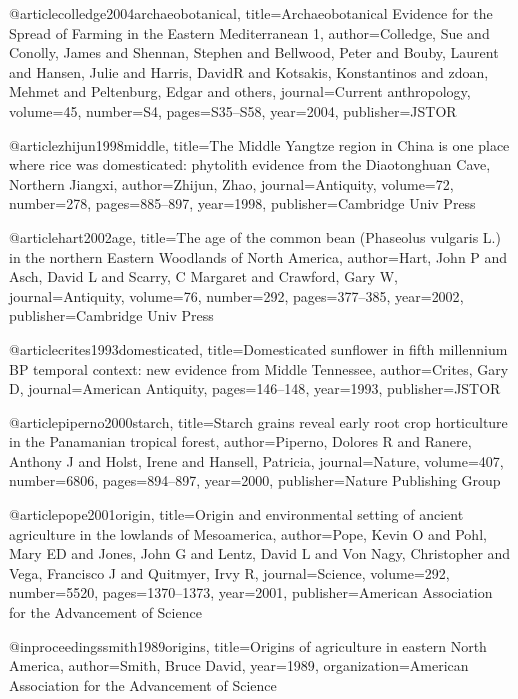 @article{colledge2004archaeobotanical,
  title={Archaeobotanical Evidence for the Spread of Farming in the Eastern Mediterranean 1},
  author={Colledge, Sue and Conolly, James and Shennan, Stephen and Bellwood, Peter and Bouby, Laurent and Hansen, Julie and Harris, DavidR and Kotsakis, Konstantinos and zdoan, Mehmet and Peltenburg, Edgar and others},
  journal={Current anthropology},
  volume={45},
  number={S4},
  pages={S35--S58},
  year={2004},
  publisher={JSTOR}
}

@article{zhijun1998middle,
  title={The Middle Yangtze region in China is one place where rice was domesticated: phytolith evidence from the Diaotonghuan Cave, Northern Jiangxi},
  author={Zhijun, Zhao},
  journal={Antiquity},
  volume={72},
  number={278},
  pages={885--897},
  year={1998},
  publisher={Cambridge Univ Press}
}

@article{hart2002age,
  title={The age of the common bean (Phaseolus vulgaris L.) in the northern Eastern Woodlands of North America},
  author={Hart, John P and Asch, David L and Scarry, C Margaret and Crawford, Gary W},
  journal={Antiquity},
  volume={76},
  number={292},
  pages={377--385},
  year={2002},
  publisher={Cambridge Univ Press}
}

@article{crites1993domesticated,
  title={Domesticated sunflower in fifth millennium BP temporal context: new evidence from Middle Tennessee},
  author={Crites, Gary D},
  journal={American Antiquity},
  pages={146--148},
  year={1993},
  publisher={JSTOR}
}

@article{piperno2000starch,
  title={Starch grains reveal early root crop horticulture in the Panamanian tropical forest},
  author={Piperno, Dolores R and Ranere, Anthony J and Holst, Irene and Hansell, Patricia},
  journal={Nature},
  volume={407},
  number={6806},
  pages={894--897},
  year={2000},
  publisher={Nature Publishing Group}
}

@article{pope2001origin,
  title={Origin and environmental setting of ancient agriculture in the lowlands of Mesoamerica},
  author={Pope, Kevin O and Pohl, Mary ED and Jones, John G and Lentz, David L and Von Nagy, Christopher and Vega, Francisco J and Quitmyer, Irvy R},
  journal={Science},
  volume={292},
  number={5520},
  pages={1370--1373},
  year={2001},
  publisher={American Association for the Advancement of Science}
}

@inproceedings{smith1989origins,
  title={Origins of agriculture in eastern North America},
  author={Smith, Bruce David},
  year={1989},
  organization={American Association for the Advancement of Science}
}

